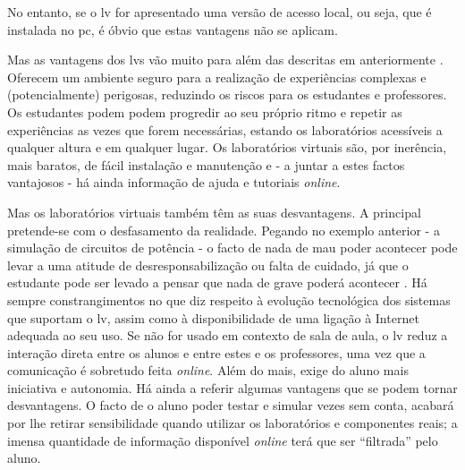 No entanto, se o \acrshort{lv} for apresentado uma versão de acesso local, ou seja, que é instalada no \acrshort{pc}, é óbvio que estas vantagens não se aplicam.

Mas as vantagens dos \acrshort{lv}s vão muito para além das descritas em anteriormente \cite{scheckler}\cite{lynch}\cite{BlogeMas95}\cite{vabtegensVL}.
Oferecem um ambiente seguro para a realização de experiências complexas e (potencialmente) perigosas, reduzindo os riscos para os estudantes e professores. Os estudantes podem podem progredir ao seu próprio ritmo e repetir as experiências as vezes que forem necessárias, estando os laboratórios acessíveis a qualquer altura e em qualquer lugar. Os laboratórios virtuais são, por inerência, mais baratos, de fácil instalação e manutenção e - a juntar a estes factos vantajosos - há ainda informação de ajuda e tutoriais \textit{online}.

Mas os laboratórios virtuais também têm as suas desvantagens. A principal pretende-se com o desfasamento da realidade. Pegando no exemplo anterior - a simulação de circuitos de potência - o facto de nada de mau poder acontecer pode levar a uma atitude de desresponsabilização ou falta de cuidado, já que o estudante pode ser levado a pensar que nada de grave poderá acontecer \cite{POTKONJAK2016309}. Há sempre constrangimentos no que diz respeito à evolução tecnológica dos sistemas que suportam o \acrshort{lv}, assim como à disponibilidade de uma ligação à Internet adequada ao seu uso. Se não for usado em contexto de sala de aula, o \acrshort{lv} reduz a interação direta entre os alunos e entre estes e os professores, uma vez que a comunicação é sobretudo feita \textit{online}. Além do mais, exige do aluno mais iniciativa e autonomia. Há ainda a referir algumas vantagens que se podem tornar desvantagens. O facto de o aluno poder testar e simular vezes sem conta, acabará por lhe retirar sensibilidade quando utilizar os laboratórios e componentes reais; a imensa quantidade de informação disponível \textit{online} terá que ser ``filtrada'' pelo aluno\cite{POTKONJAK2016309}\cite{vabtegensVL}\cite{Gherasim}\cite{Ghergulescu2019Feb}.

